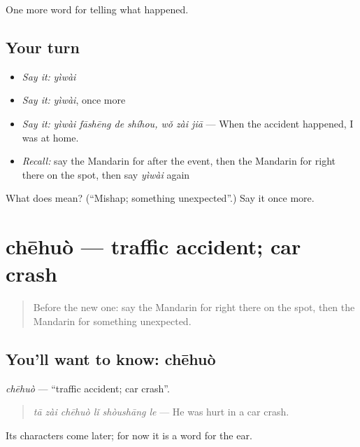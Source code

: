 \begin{grammarlens}[title={What you've built}]
One more word for telling what happened.
\end{grammarlens}

\subsection*{Your turn}
\begin{itemize}
\raggedright
  \item \emph{Say it:} \emph{yìwài}
  \item \emph{Say it:} \emph{yìwài}, once more
  \item \emph{Say it:} \emph{yìwài fāshēng de shíhou, wǒ zài jiā} — When the accident happened, I was at home.
  \item \emph{Recall:} say the Mandarin for after the event, then the Mandarin for right there on the spot, then say \emph{yìwài} again
\end{itemize}

\begin{tcolorbox}[breakable,colback=teal!4,colframe=teal!35!black,title={Before you move on}]
What does  mean? (\textquotedblleft{}Mishap; something unexpected\textquotedblright{}.) Say it once more.
\end{tcolorbox}
\section[chēhuò]{chēhuò — traffic accident; car crash}

\label{lesson:ZH-C296-chehuo}



\begin{quote}
Before the new one: say the Mandarin for right there on the spot, then the Mandarin for something unexpected.
\end{quote}

\subsection*{You'll want to know: chēhuò}
\emph{chēhuò} — \textquotedblleft{}traffic accident; car crash\textquotedblright{}.

\begin{quote}
\emph{tā zài chēhuò lǐ shòushāng le} — He was hurt in a car crash.
\end{quote}

Its characters come later; for now it is a word for the ear.

